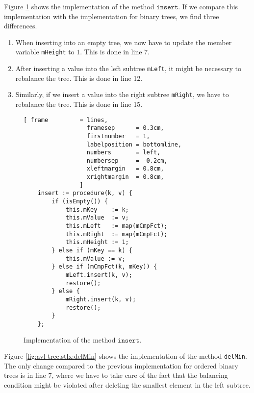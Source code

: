 Figure \ref{fig:avl-tree.stlx:insert} shows the implementation of the method $\mathtt{insert}$.
If we compare this implementation with the implementation for binary trees, we find three
differences.
\begin{enumerate}
\item When inserting into an empty tree, we now have to update the member variable \texttt{mHeight}
      to $1$.  This is done in line 7.
\item After inserting a value into the left subtree \texttt{mLeft}, it might be necessary to 
      rebalance the tree.  This is done in line 12.
\item Similarly, if we insert a value into the right subtree \texttt{mRight}, we have to rebalance 
      the tree.  This is done in line 15.
\end{enumerate}

\begin{figure}[!ht]
\centering
\begin{Verbatim}[ frame         = lines, 
                  framesep      = 0.3cm, 
                  firstnumber   = 1,
                  labelposition = bottomline,
                  numbers       = left,
                  numbersep     = -0.2cm,
                  xleftmargin   = 0.8cm,
                  xrightmargin  = 0.8cm,
                ]
    insert := procedure(k, v) {
        if (isEmpty()) { 
            this.mKey    := k;
            this.mValue  := v; 
            this.mLeft   := map(mCmpFct);
            this.mRight  := map(mCmpFct);
            this.mHeight := 1;
        } else if (mKey == k) { 
            this.mValue := v; 
        } else if (mCmpFct(k, mKey)) { 
            mLeft.insert(k, v); 
            restore();
        } else { 
            mRight.insert(k, v); 
            restore();
        }
    };
\end{Verbatim}
\vspace*{-0.3cm}
\caption{Implementation of the method $\mathtt{insert}$.}
\label{fig:avl-tree.stlx:insert}
\end{figure}

Figure \ref{fig:avl-tree.stlx:delMin} shows the implementation of the method \texttt{delMin}.
The only change compared to the previous implementation for ordered binary trees is in line 7, where
we have to take care of the fact that the balancing condition might be violated after deleting the
smallest element in the left subtree.

